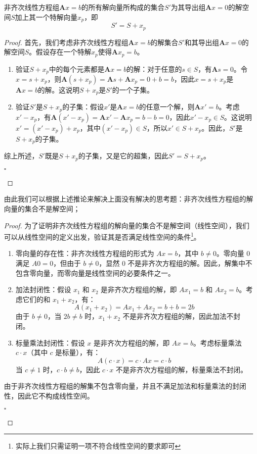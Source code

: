 \begin{corollary}
	非齐次线性方程组$\mathbf{A}x=b$的所有解向量所构成的集合$S'$为其导出组$\mathbf{A}x=0$的解空间$S$加上其一个特解向量$x_p$，即$$S'=S+x_p$$
\end{corollary}

\begin{proof}
	首先，我们考虑非齐次线性方程组$\mathbf{A}x = b$的解集合$S'$和其导出组$\mathbf{A}x = 0$的解空间$S$。假设存在一个特解$x_p$使得$\mathbf{A}x_p = b$。

	\begin{enumerate}
		\item 验证$S + x_p$中的每个元素都是$\mathbf{A}x = b$的解：对于任意的$s \in S$，有$\mathbf{A}s = 0$。令$x = s + x_p$，则$\mathbf{A}(s + x_p) = \mathbf{A}s + \mathbf{A}x_p = 0 + b = b$，因此$x = s + x_p$是$\mathbf{A}x = b$的解。这说明$S + x_p$是$S'$的一个子集。
		\item 验证$S'$是$S + x_p$的子集：假设$x'$是$\mathbf{A}x = b$的任意一个解，则$\mathbf{A}x' = b$。考虑$x' - x_p$，有$\mathbf{A}(x' - x_p) = \mathbf{A}x' - \mathbf{A}x_p = b - b = 0$，因此$x' - x_p \in S$。这说明$x' = (x' - x_p) + x_p$，其中$(x' - x_p) \in S$，所以$x' \in S + x_p$。因此，$S'$是$S + x_p$的子集。
	\end{enumerate}

	综上所述，$S'$既是$S + x_p$的子集，又是它的超集，因此$S' = S + x_p$。
	\begin{flushright}
		$\square$
	\end{flushright}
\end{proof}

由此我们可以根据上述推论来解决上面没有解决的思考题：非齐次线性方程组的解向量的集合不是解空间；

\begin{proof}
	为了证明非齐次线性方程组的解向量的集合不是解空间（线性空间），我们可以从线性空间的定义出发，验证其是否满足线性空间的条件\footnote{实际上我们只需证明一项不符合线性空间的要求即可}。

	\begin{enumerate}
		\item 零向量的存在性：非齐次线性方程组的形式为 $Ax = b$，其中 $b \neq 0$。零向量 $0$ 满足 $A0 = 0$，但由于 $b \neq 0$，显然 $0$ 不是非齐次方程组的解。因此，解集中不包含零向量，而零向量是线性空间的必要条件之一。
		\item 加法封闭性：假设 $x_1$ 和 $x_2$ 是非齐次方程组的解，即 $Ax_1 = b$ 和 $Ax_2 = b$。考虑它们的和 $x_1 + x_2$，有：
		$$
		A(x_1 + x_2) = Ax_1 + Ax_2 = b + b = 2b
		$$
		由于 $b \neq 0$，当 $2b \neq b$ 时，$x_1 + x_2$ 不是非齐次方程组的解，因此加法不封闭。
		\item 标量乘法封闭性：假设 $x$ 是非齐次方程组的解，即 $Ax = b$。考虑标量乘法 $c \cdot x$（其中 $c$ 是标量），有：
		$$
		A(c \cdot x) = c \cdot Ax = c \cdot b
		$$
		当 $c \neq 1$ 时，$c \cdot b \neq b$，因此 $c \cdot x$ 不是非齐次方程组的解，标量乘法不封闭。
	\end{enumerate}

	由于非齐次线性方程组的解集不包含零向量，并且不满足加法和标量乘法的封闭性，因此它不构成线性空间。
	\begin{flushright}
		$\square$
	\end{flushright}
\end{proof}

